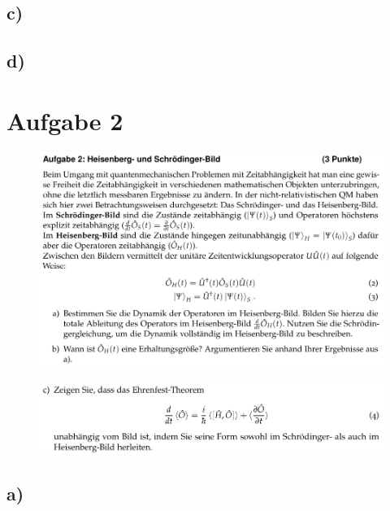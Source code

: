 \subsection{c)}

\subsection{d)}

\section{Aufgabe 2}

    \begin{figure}[H]
        \centering
        \includegraphics[width=\textwidth]{images/Aufgabe2a.jpg}
        \label{fig:2}
    \end{figure}

    \begin{figure}[H]
        \centering
        \includegraphics[width=\textwidth]{images/Aufgabe2b.jpg}
        \label{fig:3}
    \end{figure}

\subsection{a)}

